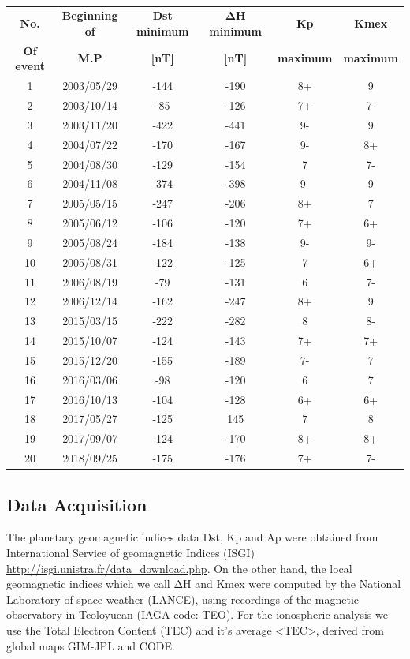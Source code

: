 \documentclass[a4paper, 11pt]{article}
\begin{document}
\begin{table}[htbp]
\caption{}
\begin{center}
\begin{tabular}{cccccc}

\textbf{No.} & \textbf{Beginning of} & \textbf{Dst minimum}
 & $\mathbf{\Delta H}$ \textbf{minimum}
 & \textbf{Kp} & \textbf{Kmex} \\
\textbf{Of event}& \textbf{M.P} & \textbf{[nT]} & \textbf{[nT]} & \textbf{maximum} & \textbf{maximum}\\
1 & 2003/05/29  & -144 & -190 & 8+  & 9 \\ 
2 & 2003/10/14  & -85 & -126 & 7+  & 7-  \\ 
3 & 2003/11/20  & -422 & -441 & 9-  & 9 \\ 
4 & 2004/07/22  & -170 & -167 & 9-  & 8+  \\ 
5 & 2004/08/30  & -129 & -154 & 7 & 7-  \\ 
6 & 2004/11/08  & -374 & -398 & 9-  & 9 \\ 
7 & 2005/05/15  & -247 & -206 & 8+  & 7 \\ 
8 & 2005/06/12  & -106 & -120 & 7+  & 6+  \\ 
9 & 2005/08/24  & -184 & -138 & 9-  & 9-  \\ 
10 & 2005/08/31  & -122 & -125 & 7 & 6+  \\ 
11 & 2006/08/19  & -79 & -131 & 6 & 7-  \\ 
12 & 2006/12/14  & -162 & -247 & 8+  & 9 \\ 
13 & 2015/03/15  & -222 & -282 & 8 & 8-  \\ 
14 & 2015/10/07  & -124 & -143 & 7+  & 7+  \\ 
15 & 2015/12/20  & -155 & -189 & 7-  & 7 \\ 
16 & 2016/03/06  & -98 & -120 & 6 & 7 \\ 
17 & 2016/10/13  & -104 & -128 & 6+  & 6+  \\ 
18 & 2017/05/27  & -125 & 145 & 7 & 8 \\ 
19 & 2017/09/07  & -124 & -170 & 8+  & 8+  \\ 
20 & 2018/09/25  & -175 & -176 & 7+  & 7-  \\ 
\end{tabular}
\end{center}
\label{eventstab}
\end{table}


\subsection*{Data Acquisition }
The planetary geomagnetic indices data Dst, Kp and Ap were obtained from International Service of geomagnetic Indices (ISGI) \url{http://isgi.unistra.fr/data_download.php}.  On the other hand, the local geomagnetic indices which we call $\mathrm{\Delta H}$ and Kmex were computed by the National Laboratory of space weather (LANCE), using recordings of the magnetic observatory in Teoloyucan (IAGA code: TEO). For the ionospheric analysis we use the Total Electron Content (TEC) and it’s average <TEC>, derived from global maps GIM-JPL and CODE.\\  
\end{document}
